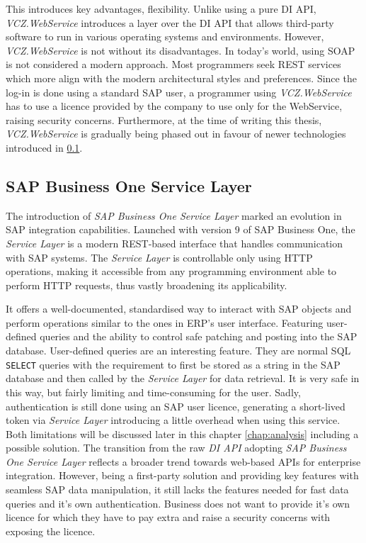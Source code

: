 This introduces key advantages, flexibility. 
Unlike using a pure \ac{DI API}, \textit{VCZ.WebService} introduces a layer over the \ac{DI API} that allows third-party software to run in various operating systems and environments.
However, \textit{VCZ.WebService} is not without its disadvantages.
In today's world, using \ac{SOAP} is not considered a modern approach. Most programmers seek \ac{REST} services which more align with the modern architectural styles and preferences.
Since the log-in is done using a standard SAP user, a programmer using \textit{VCZ.WebService} has to use a licence provided by the company to use only for the WebService, raising security concerns.
Furthermore, at the time of writing this thesis, \textit{VCZ.WebService} is gradually being phased out in favour of newer technologies introduced in \ref{subsec:sap-b1-service-layer}.

\subsection{SAP Business One Service Layer}
\label{subsec:sap-b1-service-layer}

The introduction of \textit{ SAP Business One Service Layer} marked an evolution in SAP integration capabilities. 
Launched with version 9 of SAP Business One, the \textit{Service Layer} is a modern \ac{REST}-based interface that handles communication with SAP systems. 
The \textit{Service Layer} is controllable only using HTTP operations, making it accessible from any programming environment able to perform HTTP requests, thus vastly broadening its applicability.

It offers a well-documented, standardised way to interact with SAP objects and perform operations similar to the ones in \ac{ERP}'s user interface. 
Featuring user-defined queries and the ability to control safe patching and posting into the SAP database.
User-defined queries are an interesting feature. They are normal SQL \texttt{SELECT} queries with the requirement to first be stored as a string in the SAP database and then called by the \textit{ Service Layer} for data retrieval.
It is very safe in this way, but fairly limiting and time-consuming for the user. 
Sadly, authentication is still done using an SAP user licence, generating a short-lived token via \textit{Service Layer} introducing a little overhead when using this service.
Both limitations will be discussed later in this chapter \ref{chap:analysis} including a possible solution.
The transition from the raw \textit{DI API} adopting \textit{SAP Business One Service Layer} reflects a broader trend towards web-based APIs for enterprise integration.
However, being a first-party solution and providing key features with seamless SAP data manipulation, it still lacks the features needed for fast data queries and it's own authentication. Business does not want to provide it's own licence for which they have to pay extra and raise a security concerns with exposing the licence.

